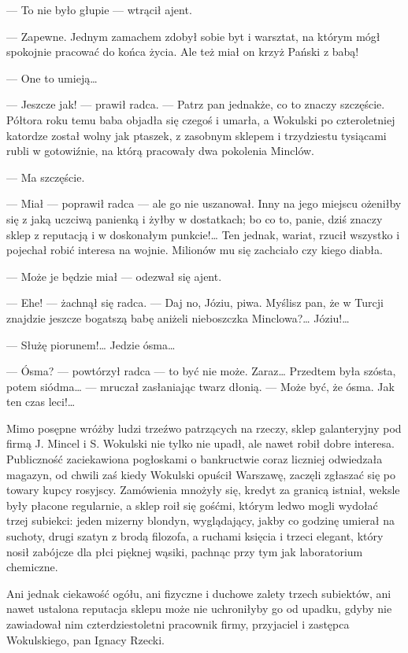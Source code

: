 \documentclass{book}
\begin{document}
— To nie było głupie — wtrącił ajent.

— Zapewne. Jednym zamachem zdobył sobie byt i warsztat, na którym mógł spokojnie pracować do końca życia. Ale też miał on krzyż Pański z babą!

— One to umieją…

— Jeszcze jak! — prawił radca. — Patrz pan jednakże, co to znaczy szczęście. Półtora roku temu baba objadła się czegoś i umarła, a Wokulski po czteroletniej katordze został wolny jak ptaszek, z zasobnym sklepem i trzydziestu tysiącami rubli w gotowiźnie, na którą pracowały dwa pokolenia Minclów.

— Ma szczęście.

— Miał — poprawił radca — ale go nie uszanował. Inny na jego miejscu ożeniłby się z jaką uczciwą panienką i żyłby w dostatkach; bo co to, panie, dziś znaczy sklep z reputacją i w doskonałym punkcie!… Ten jednak, wariat, rzucił wszystko i pojechał robić interesa na wojnie. Milionów mu się zachciało czy kiego diabła.

— Może je będzie miał — odezwał się ajent.

— Ehe! — żachnął się radca. — Daj no, Józiu, piwa. Myślisz pan, że w Turcji znajdzie jeszcze bogatszą babę aniżeli nieboszczka Minclowa?… Józiu!…

— Służę piorunem!… Jedzie ósma…

— Ósma? — powtórzył radca — to być nie może. Zaraz… Przedtem była szósta, potem siódma… — mruczał zasłaniając twarz dłonią. — Może być, że ósma. Jak ten czas leci!…

Mimo posępne wróżby ludzi trzeźwo patrzących na rzeczy, sklep galanteryjny pod firmą J. Mincel i S. Wokulski nie tylko nie upadł, ale nawet robił dobre interesa. Publiczność zaciekawiona pogłoskami o bankructwie coraz liczniej odwiedzała magazyn, od chwili zaś kiedy Wokulski opuścił Warszawę, zaczęli zgłaszać się po towary kupcy rosyjscy. Zamówienia mnożyły się, kredyt za granicą istniał, weksle były płacone regularnie, a sklep roił się gośćmi, którym ledwo mogli wydołać trzej subiekci: jeden mizerny blondyn, wyglądający, jakby co godzinę umierał na suchoty, drugi szatyn z brodą filozofa, a ruchami księcia i trzeci elegant, który nosił zabójcze dla płci pięknej wąsiki, pachnąc przy tym jak laboratorium chemiczne.

Ani jednak ciekawość ogółu, ani fizyczne i duchowe zalety trzech subiektów, ani nawet ustalona reputacja sklepu może nie uchroniłyby go od upadku, gdyby nie zawiadował nim czterdziestoletni pracownik firmy, przyjaciel i zastępca Wokulskiego, pan Ignacy Rzecki.
\end{document}
